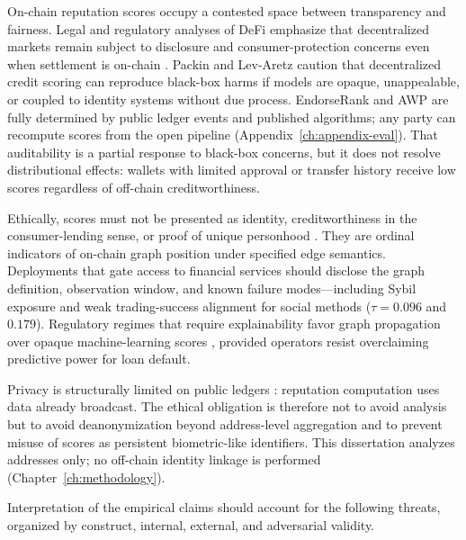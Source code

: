 
On-chain reputation scores occupy a contested space between transparency and fairness. Legal and regulatory analyses of DeFi emphasize that decentralized markets remain subject to disclosure and consumer-protection concerns even when settlement is on-chain . Packin and Lev-Aretz caution that decentralized credit scoring can reproduce black-box harms if models are opaque, unappealable, or coupled to identity systems without due process. EndorseRank and AWP are fully determined by public ledger events and published algorithms; any party can recompute scores from the open pipeline (Appendix~\ref{ch:appendix-eval}). That auditability is a partial response to black-box concerns, but it does not resolve distributional effects: wallets with limited approval or transfer history receive low scores regardless of off-chain creditworthiness.

Ethically, scores must not be presented as identity, creditworthiness in the consumer-lending sense, or proof of unique personhood . They are ordinal indicators of on-chain graph position under specified edge semantics. Deployments that gate access to financial services should disclose the graph definition, observation window, and known failure modes---including Sybil exposure and weak trading-success alignment for social methods ($\tau=0.096$ and $0.179$). Regulatory regimes that require explainability favor graph propagation over opaque machine-learning scores , provided operators resist overclaiming predictive power for loan default.

Privacy is structurally limited on public ledgers : reputation computation uses data already broadcast. The ethical obligation is therefore not to avoid analysis but to avoid deanonymization beyond address-level aggregation and to prevent misuse of scores as persistent biometric-like identifiers. This dissertation analyzes addresses only; no off-chain identity linkage is performed (Chapter~\ref{ch:methodology}).


Interpretation of the empirical claims should account for the following threats, organized by construct, internal, external, and adversarial validity.


